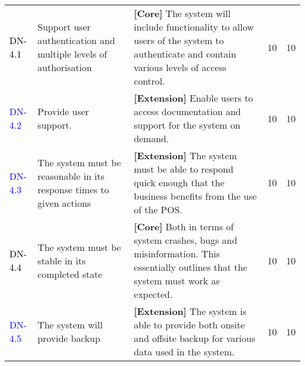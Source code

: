 \documentclass[a4paper]{article}
\begin{document}
\begin{longtable}{|l|p{5cm}|p{7cm}|p{0.5cm}|p{0.5cm}|}
\hline
  \textcolor{black}{DN-4.1} &  Support user authentication and multiple levels of authorisation & \textbf{[Core] }The system will include functionality to allow users of the system to authenticate and contain various levels of access control.& 10 & 10\\
  \textcolor{blue} {DN-4.2} &  Provide user support. & \textbf{[Extension] }Enable users to access documentation and support for the system on demand. & 10 & 10\\
  \textcolor{blue} {DN-4.3} &  The system must be reasonable in its response times to given actions & \textbf{[Extension] }The system must be able to respond quick enough that the business benefits from the use of the POS. & 10 & 10\\
  \textcolor{black} {DN-4.4} & The system must be stable in its completed state & \textbf{[Core] }Both in terms of system crashes, bugs and misinformation. This essentially outlines that the system must work as expected. & 10 & 10\\
\textcolor{blue}{DN-4.5} & The system will provide backup & \textbf{[Extension] }The system is able to provide both onsite and offsite backup for various data used in the system. & 10 & 10\\
  \hline
\end{longtable}

\pagebreak
\end{document}
